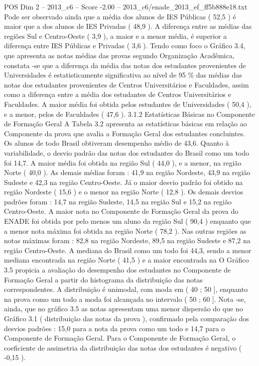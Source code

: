 \begin{textsample}{POS Dim 2 – 2013\_c6 – Score -2.00 – 2013\_c6/enade\_2013\_ef\_ff5b888e18.txt}
Pode ser observado ainda que a média dos alunos de IES Públicas ( 52,5 ) é maior que a dos alunos de IES Privadas ( 48,9 ).
A diferença entre as médias das regiões Sul e Centro-Oeste ( 3,9 ), a maior e a menor média, é superior a diferença entre IES Públicas e Privadas ( 3,6 ).
Tendo como foco o Gráfico 3.4, que apresenta as notas médias das provas segundo Organização Acadêmica, constata -se que a diferença da média das notas dos estudantes provenientes de Universidades é estatisticamente significativa ao nível de 95 \% das médias das notas dos estudantes provenientes de Centros Universitários e Faculdades, assim como a diferença entre a média dos estudantes de Centros Universitários e Faculdades.
A maior média foi obtida pelos estudantes de Universidades ( 50,4 ), e a menor, pelos de Faculdades ( 47,6 ). 3.1.2 Estatísticas Básicas no Componente de Formação Geral A Tabela 3.2 apresenta as estatísticas básicas em relação ao Componente da prova que avalia a Formação Geral dos estudantes concluintes.
Os alunos de todo Brasil obtiveram desempenho médio de 43,6.
Quanto à variabilidade, o desvio padrão das notas dos estudantes do Brasil como um todo foi 14,7.
A maior média foi obtida na região Sul ( 44,0 ), e a menor, na região Norte ( 40,0 ).
As demais médias foram : 41,9 na região Nordeste, 43,9 na região Sudeste e 42,3 na região Centro-Oeste.
Já o maior desvio padrão foi obtido na região Nordeste ( 15,6 ) e o menor na região Norte ( 12,8 ).
Os demais desvios padrões foram : 14,7 na região Sudeste, 14,5 na região Sul e 15,2 na região Centro-Oeste.
A maior nota no Componente de Formação Geral da prova do ENADE foi obtida por pelo menos um aluno da região Sul ( 90,4 ) enquanto que a menor nota máxima foi obtida na região Norte ( 78,2 ).
Nas outras regiões as notas máximas foram : 82,8 na região Nordeste, 89,5 na região Sudeste e 87,2 na região Centro-Oeste.
A mediana do Brasil como um todo foi 44,3, sendo a menor mediana encontrada na região Norte ( 41,5 ) e a maior encontrada na O Gráfico 3.5 propicia a avaliação do desempenho dos estudantes no Componente de Formação Geral a partir do histograma da distribuição das notas correspondentes.
A distribuição é unimodal, com moda em ( 40 ; 50 ], enquanto na prova como um todo a moda foi alcançada no intervalo ( 50 ; 60 ].
Nota -se, ainda, que no gráfico 3.5 as notas apresentam uma menor dispersão do que no Gráfico 3.1 ( distribuição das notas da prova ), confirmado pela comparação dos desvios padrões : 15,0 para a nota da prova como um todo e 14,7 para o Componente de Formação Geral.
Para o Componente de Formação Geral, o coeficiente de assimetria da distribuição das notas dos estudantes é negativo ( -0,15 ).

\end{textsample}
